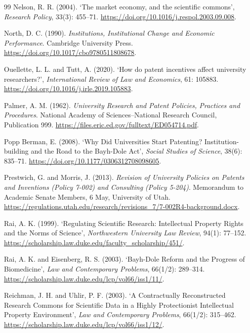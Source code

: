 \begin{thebibliography}{99}
 Nelson, R. R. (2004). `The market economy, and the scientific commons', \emph{Research Policy}, 33(3): 455--71. \url{https://doi.org/10.1016/j.respol.2003.09.008}.

 North, D. C. (1990). \emph{Institutions, Institutional Change and Economic Performance}. Cambridge University Press. \url{https://doi.org/10.1017/cbo9780511808678}.

 Ouellette, L. L. and Tutt, A. (2020). `How do patent incentives affect university researchers?', \emph{International Review of Law and Economics}, 61: 105883. \url{https://doi.org/10.1016/j.irle.2019.105883}.

 Palmer, A. M. (1962). \emph{University Research and Patent Policies, Practices and Procedures}. National Academy of Sciences--National Research Council, Publication 999. \url{https://files.eric.ed.gov/fulltext/ED054714.pdf}.

 Popp Berman, E. (2008). `Why Did Universities Start Patenting? Institution-building and the Road to the Bayh-Dole Act', \emph{Social Studies of Science}, 38(6): 835--71. \url{https://doi.org/10.1177/0306312708098605}.

 Prestwich, G. and Morris, J. (2013). \emph{Revision of University Policies on Patents and Inventions (Policy 7-002) and Consulting (Policy 5-204)}. Memorandum to Academic Senate Members, 6 May, University of Utah. \url{https://regulations.utah.edu/research/revisions_7/7-002R4-background.docx}.

 Rai, A. K. (1999). `Regulating Scientific Research: Intellectual Property Rights and the Norms of Science', \emph{Northwestern University Law Review}, 94(1): 77--152. \url{https://scholarship.law.duke.edu/faculty_scholarship/451/}.

 Rai, A. K. and Eisenberg, R. S. (2003). `Bayh-Dole Reform and the Progress of Biomedicine', \emph{Law and Contemporary Problems}, 66(1/2): 289--314. \url{https://scholarship.law.duke.edu/lcp/vol66/iss1/11/}.

 Reichman, J. H. and Uhlir, P. F. (2003). `A Contractually Reconstructed Research Commons for Scientific Data in a Highly Protectionist Intellectual Property Environment', \emph{Law and Contemporary Problems}, 66(1/2): 315--462. \url{https://scholarship.law.duke.edu/lcp/vol66/iss1/12/}.


\end{thebibliography}
